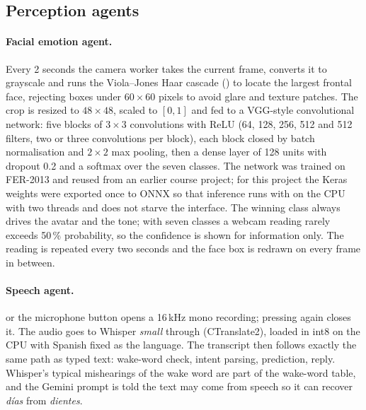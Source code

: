 \subsection{Perception agents}

\paragraph{Facial emotion agent.}
Every 2 seconds the camera worker takes the current frame, converts it to
grayscale and runs the Viola--Jones Haar cascade
() to locate the largest frontal face,
rejecting boxes under $60\times60$ pixels to avoid glare and texture
patches. The crop is resized to $48\times48$, scaled to $[0,1]$ and fed to a
VGG-style convolutional network: five blocks of
$3\times3$ convolutions with ReLU (64, 128, 256, 512 and 512 filters, two or
three convolutions per block), each block closed by batch normalisation and
$2\times2$ max pooling, then a dense layer of 128 units with dropout 0.2 and
a softmax over the seven classes. The network was trained on FER-2013 and reused from an earlier course project; for this
project the Keras weights were exported once to ONNX so that inference runs
with  on the CPU with two threads and does not starve the
interface. The winning class always drives the avatar and the tone; with
seven classes a webcam reading rarely exceeds 50\,\% probability, so the
confidence is shown for information only. The reading is repeated every two
seconds and the face box is redrawn on every frame in between.

\paragraph{Speech agent.}
 or the microphone button opens a 16\,kHz mono recording;
pressing again closes it. The audio goes to Whisper \emph{small} through  (CTranslate2), loaded
in int8 on the CPU with Spanish fixed as the language. The transcript then
follows exactly the same path as typed text: wake-word check, intent
parsing, prediction, reply. Whisper's typical mishearings of the wake word
are part of the wake-word table, and the Gemini prompt is told the text may
come from speech so it can recover \emph{días} from \emph{dientes}.

